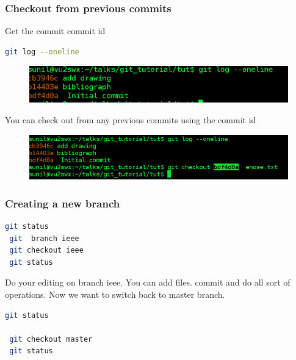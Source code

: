 \documentclass[10pt,a4paper]{beamer}
\begin{document}
\begin{frame}[fragile]
\frametitle{  Checkout from previous commits}
 
 Get the commit commit id
  \begin{lstlisting}[language=bash]
  git log --oneline

\end{lstlisting}

\begin{figure}
  \includegraphics[scale=.4]{12}
 \end{figure}
 
You can check out from any previous commits using the commit id
\begin{figure}
  \includegraphics[scale=.4]{13}
 \end{figure}
  
\end{frame}

\begin{frame}[fragile]
\frametitle{  Creating a new branch}

  
  \begin{lstlisting}[language=bash]
 git status
 git  branch ieee
 git checkout ieee
 git status
\end{lstlisting}

Do your editing on branch ieee. You can add files. commit and do all sort of operations.
Now we want to switch back to master branch.

  \begin{lstlisting}[language=bash]
 git status
 
 git checkout master
 git status
\end{lstlisting}
\end{frame}
\end{document}
